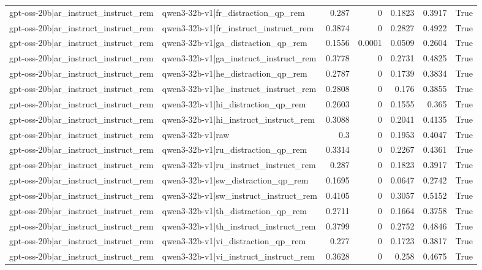 \begin{table}
\begin{tabular}{l l r r r r l}
gpt-oss-20b|ar_instruct_instruct_rem & qwen3-32b-v1|fr_distraction_qp_rem & 0.287 & 0 & 0.1823 & 0.3917 & True \\
gpt-oss-20b|ar_instruct_instruct_rem & qwen3-32b-v1|fr_instruct_instruct_rem & 0.3874 & 0 & 0.2827 & 0.4922 & True \\
gpt-oss-20b|ar_instruct_instruct_rem & qwen3-32b-v1|ga_distraction_qp_rem & 0.1556 & 0.0001 & 0.0509 & 0.2604 & True \\
gpt-oss-20b|ar_instruct_instruct_rem & qwen3-32b-v1|ga_instruct_instruct_rem & 0.3778 & 0 & 0.2731 & 0.4825 & True \\
gpt-oss-20b|ar_instruct_instruct_rem & qwen3-32b-v1|he_distraction_qp_rem & 0.2787 & 0 & 0.1739 & 0.3834 & True \\
gpt-oss-20b|ar_instruct_instruct_rem & qwen3-32b-v1|he_instruct_instruct_rem & 0.2808 & 0 & 0.176 & 0.3855 & True \\
gpt-oss-20b|ar_instruct_instruct_rem & qwen3-32b-v1|hi_distraction_qp_rem & 0.2603 & 0 & 0.1555 & 0.365 & True \\
gpt-oss-20b|ar_instruct_instruct_rem & qwen3-32b-v1|hi_instruct_instruct_rem & 0.3088 & 0 & 0.2041 & 0.4135 & True \\
gpt-oss-20b|ar_instruct_instruct_rem & qwen3-32b-v1|raw & 0.3 & 0 & 0.1953 & 0.4047 & True \\
gpt-oss-20b|ar_instruct_instruct_rem & qwen3-32b-v1|ru_distraction_qp_rem & 0.3314 & 0 & 0.2267 & 0.4361 & True \\
gpt-oss-20b|ar_instruct_instruct_rem & qwen3-32b-v1|ru_instruct_instruct_rem & 0.287 & 0 & 0.1823 & 0.3917 & True \\
gpt-oss-20b|ar_instruct_instruct_rem & qwen3-32b-v1|sw_distraction_qp_rem & 0.1695 & 0 & 0.0647 & 0.2742 & True \\
gpt-oss-20b|ar_instruct_instruct_rem & qwen3-32b-v1|sw_instruct_instruct_rem & 0.4105 & 0 & 0.3057 & 0.5152 & True \\
gpt-oss-20b|ar_instruct_instruct_rem & qwen3-32b-v1|th_distraction_qp_rem & 0.2711 & 0 & 0.1664 & 0.3758 & True \\
gpt-oss-20b|ar_instruct_instruct_rem & qwen3-32b-v1|th_instruct_instruct_rem & 0.3799 & 0 & 0.2752 & 0.4846 & True \\
gpt-oss-20b|ar_instruct_instruct_rem & qwen3-32b-v1|vi_distraction_qp_rem & 0.277 & 0 & 0.1723 & 0.3817 & True \\
gpt-oss-20b|ar_instruct_instruct_rem & qwen3-32b-v1|vi_instruct_instruct_rem & 0.3628 & 0 & 0.258 & 0.4675 & True \\

\end{tabular}
\end{table}
